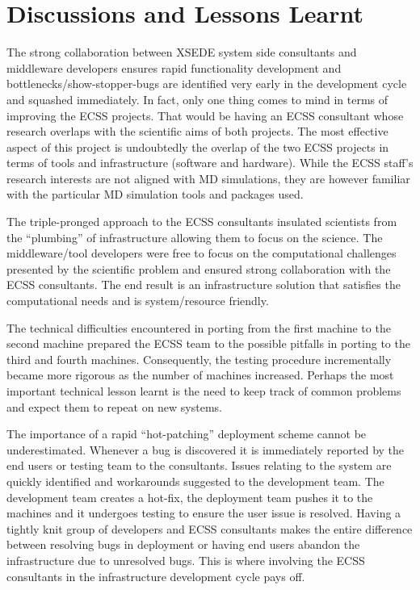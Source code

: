 \documentclass{sig-alternate}
\begin{document}
\section{Discussions and Lessons Learnt}


The strong collaboration between XSEDE system side consultants
and middleware developers ensures rapid functionality
development and bottlenecks/show-stopper-bugs are identified very
early in the development cycle and squashed immediately. In fact, only
one thing comes to mind in terms of improving the ECSS projects. That
would be having an ECSS consultant whose research overlaps with the
scientific aims of both projects. The most effective aspect of this
project is undoubtedly the overlap of the two ECSS projects in terms
of tools and infrastructure (software and hardware). While the ECSS
staff's research interests are not aligned with MD simulations, they
are however familiar with the particular MD simulation tools and
packages used.

The triple-pronged approach to the ECSS consultants insulated scientists from
the ``plumbing'' of infrastructure allowing them to focus on the science. The
middleware/tool developers were free to focus on the computational challenges
presented by the scientific problem and ensured strong collaboration with the
ECSS consultants. The end result is an infrastructure solution that satisfies
the computational needs and is system/resource friendly.

The technical difficulties encountered in porting from the first
machine to the second machine prepared the ECSS team to the possible
pitfalls in porting to the third and fourth machines. Consequently,
the testing procedure incrementally became more rigorous as the number
of machines increased. Perhaps the most important technical lesson
learnt is the need to keep track of common problems and expect them to
repeat on new systems.

The importance of a rapid ``hot-patching'' deployment scheme cannot be
underestimated. Whenever a bug is discovered it is immediately
reported by the end users or testing team to the consultants. Issues
relating to the system are quickly identified and workarounds
suggested to the development team. The development team creates a
hot-fix, the deployment team pushes it to the machines and it
undergoes testing to ensure the user issue is resolved. Having a
tightly knit group of developers and ECSS consultants makes the entire
difference between resolving bugs in deployment or having end users
abandon the infrastructure due to unresolved bugs. This is where
involving the ECSS consultants in the infrastructure development cycle
pays off.
\end{document}
